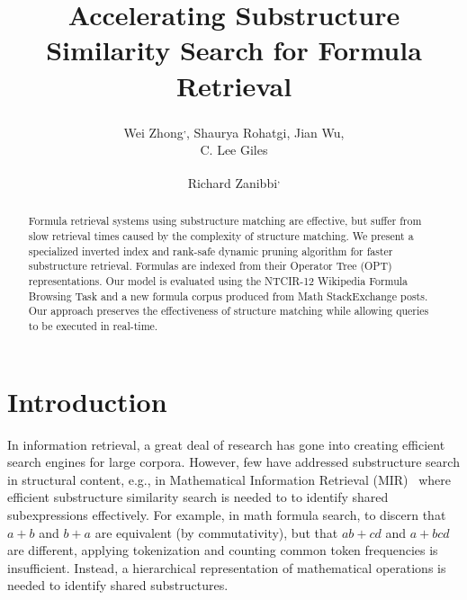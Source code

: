 \documentclass[runningheads]{llncs}
\begin{document}
%
\title{Accelerating Substructure Similarity Search for Formula Retrieval}

\author{Wei Zhong\textsuperscript{,\Letter}, Shaurya Rohatgi, Jian Wu, \\ C. Lee Giles \and Richard Zanibbi\textsuperscript{,\Letter}}


\maketitle

\begin{abstract}
Formula retrieval systems using substructure matching are effective, but suffer from slow retrieval times caused by the complexity of structure matching.  We present a specialized inverted index and rank-safe dynamic pruning algorithm for faster substructure retrieval. Formulas are indexed from their Operator Tree (OPT) representations. Our model is evaluated using the NTCIR-12 Wikipedia Formula Browsing Task and a new formula corpus produced from Math StackExchange posts.  Our approach preserves the effectiveness of structure matching while allowing queries to be executed in real-time.

\end{abstract}

\section{Introduction}
In information retrieval, a great deal of research has gone into creating efficient search engines for large corpora.
However, few have addressed substructure search in structural content, e.g., in Mathematical Information Retrieval (MIR)~\cite{survey2012} where efficient substructure similarity search is needed to to identify shared subexpressions effectively.
For example, in math formula search, to discern that $a+b$ and $b + a$ are equivalent (by commutativity), but that $ab+cd$ and $a+bcd$ are different,  applying tokenization and counting common token frequencies is insufficient. Instead, a hierarchical representation of mathematical operations is needed to identify shared substructures.
\end{document}
